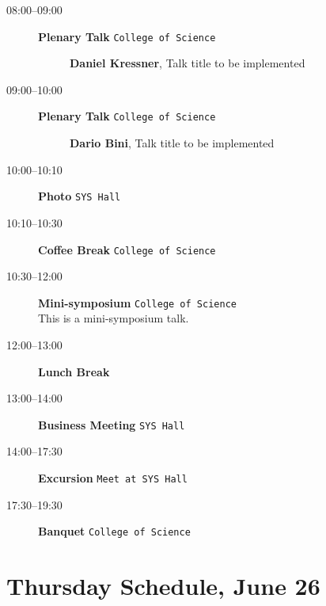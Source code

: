 \documentclass[ILAS2025-program.tex]{subfiles}
\begin{document}
    \begin{description}
    \item[08:00--09:00] \textbf{Plenary Talk} {\footnotesize\texttt{College of Science}}
    \begin{description}
        \item[] \textbf{Daniel Kressner}, Talk title to be implemented
        \end{description}
        \item[09:00--10:00] \textbf{Plenary Talk} {\footnotesize\texttt{College of Science}}
    \begin{description}
        \item[] \textbf{Dario Bini}, Talk title to be implemented
        \end{description}
        \item[10:00--10:10] \textbf{Photo} {\footnotesize\texttt{SYS Hall}}
    \item[10:10--10:30] \textbf{Coffee Break} {\footnotesize\texttt{College of Science}}
    \item[10:30--12:00] \textbf{Mini-symposium} {\footnotesize\texttt{College of Science}}
    \\This is a mini-symposium talk.\item[12:00--13:00] \textbf{Lunch Break} {\footnotesize\texttt{}}
    \item[13:00--14:00] \textbf{Business Meeting} {\footnotesize\texttt{SYS Hall}}
    \item[14:00--17:30] \textbf{Excursion} {\footnotesize\texttt{Meet at SYS Hall}}
    \item[17:30--19:30] \textbf{Banquet} {\footnotesize\texttt{College of Science}}
    \end{description}
    \newpage

\section{Thursday Schedule, June 26}
    
\end{document}
